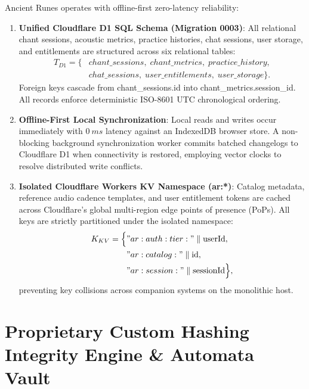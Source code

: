 \documentclass[11pt,a4paper,reqno]{article}
\def\texttt#1{#1}%
\def\mathrm#1{#1}%
\def\mathcal#1{#1}%
\theoremstyle{plain}
\theoremstyle{definition}
\theoremstyle{remark}
\numberwithin{equation}{section}
\begin{document}
Ancient Runes operates with offline-first zero-latency reliability:
\begin{enumerate}
    \item \textbf{Unified Cloudflare D1 SQL Schema (Migration 0003)}:
    All relational chant sessions, acoustic metrics, practice histories, chat sessions, user storage, and entitlements are structured across six relational tables:
    \begin{equation}
    \label{eq:d1_tables}
    \begin{aligned}
    \mathcal{T}_{\mathrm{D1}} = \Big\{ &\texttt{chant\_sessions}, \; \texttt{chant\_metrics}, \; \texttt{practice\_history}, \\
    &\texttt{chat\_sessions}, \; \texttt{user\_entitlements}, \; \texttt{user\_storage} \Big\}.
    \end{aligned}
    \end{equation}
    Foreign keys cascade from \texttt{chant\_sessions.id} into \texttt{chant\_metrics.session\_id}. All records enforce deterministic ISO-8601 UTC chronological ordering.
    \item \textbf{Offline-First Local Synchronization}:
    Local reads and writes occur immediately with $0\ \mathrm{ms}$ latency against an IndexedDB browser store. A non-blocking background synchronization worker commits batched changelogs to Cloudflare D1 when connectivity is restored, employing vector clocks to resolve distributed write conflicts.
    \item \textbf{Isolated Cloudflare Workers KV Namespace (\texttt{ar:*})}:
    Catalog metadata, reference audio cadence templates, and user entitlement tokens are cached across Cloudflare's global multi-region edge points of presence (PoPs). All keys are strictly partitioned under the isolated namespace:
    \begin{equation}
    \label{eq:kv_schema_keys}
    \begin{aligned}
    \mathcal{K}_{\mathrm{KV}} = \Big\{ &\texttt{"ar:auth:tier:"} \parallel \text{userId}, \\
    &\texttt{"ar:catalog:"} \parallel \text{id}, \\
    &\texttt{"ar:session:"} \parallel \text{sessionId} \Big\},
    \end{aligned}
    \end{equation}
    preventing key collisions across companion systems on the monolithic host.
\end{enumerate}

\section{\texorpdfstring{Proprietary Custom Hashing Integrity Engine \& Automata Vault}{Proprietary Custom Hashing Integrity Engine and Automata Vault}}
\label{sec:crypto}
\end{document}
